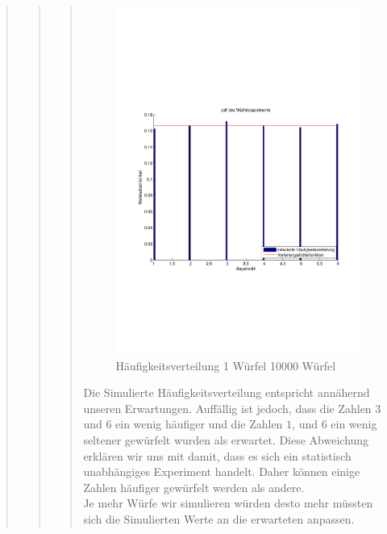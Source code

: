 \begin{quote}
\begin{quote}
\begin{quote}
                
                \begin{figure}[H] \centering
                    \includegraphics[scale=0.5, trim = 2cm 6.5cm 1.5cm 8.5cm, clip]{./Bilder/1wuerfelpdf}
                        \caption{Häufigkeitsverteilung 1 Würfel 10000 Würfel}
                \end{figure}
                
                Die Simulierte Häufigkeitsverteilung entspricht annähernd unseren Erwartungen. Auffällig ist jedoch,
                dass die Zahlen $3$ und $6$ ein wenig häufiger und die Zahlen $1$, und $6$ ein wenig seltener gewürfelt
                wurden als erwartet.
                Diese Abweichung erklären wir uns mit damit, dass es sich ein statistisch unabhängiges Experiment
                handelt. Daher können einige Zahlen häufiger gewürfelt werden als andere.\\
                Je mehr Würfe wir simulieren würden desto mehr müssten sich die Simulierten Werte an die erwarteten
                anpassen.\\
        \end{quote}
        

\end{quote}
\end{quote}
